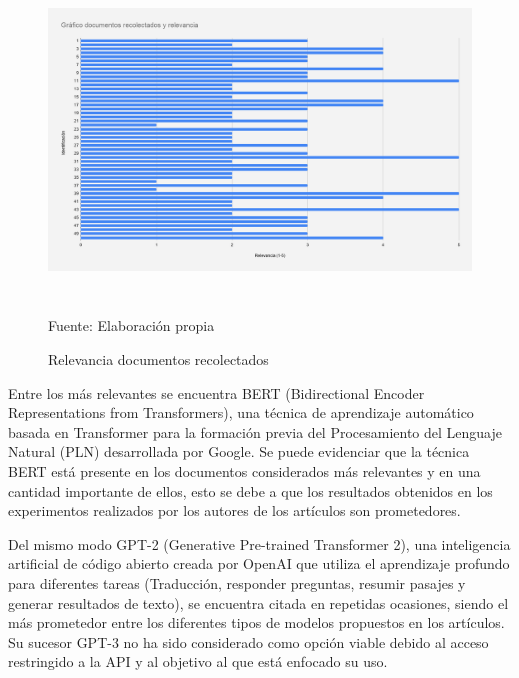 \documentclass[../Main.tex]{subfiles}
\begin{document}
\begin{figure}[H]
	\begin{Center}
		\includegraphics[width=6in,height=3.3in]{Images/GraficoPapers.png}
	    \caption{Relevancia documentos recolectados}
	    Fuente: Elaboración propia
        \label{fig:section}
	\end{Center}
\end{figure}

\begin{justify}
Entre los más relevantes se encuentra BERT (Bidirectional Encoder Representations from Transformers), una técnica de aprendizaje automático basada en Transformer para la formación previa del Procesamiento del Lenguaje Natural (PLN) desarrollada por Google. Se puede evidenciar que la técnica BERT está presente en los documentos considerados más relevantes y en una cantidad importante de ellos, esto se debe a que los resultados obtenidos en los experimentos realizados por los autores de los artículos son prometedores.
\end{justify}

\begin{justify}
Del mismo modo GPT-2 (Generative Pre-trained Transformer 2), una inteligencia artificial de código abierto creada por OpenAI que  utiliza el aprendizaje profundo para diferentes tareas (Traducción, responder preguntas, resumir pasajes y generar resultados de texto), se encuentra citada en repetidas ocasiones, siendo el más prometedor entre los diferentes tipos de modelos propuestos en los artículos. Su sucesor GPT-3 no ha sido considerado como opción viable debido al acceso restringido a la API y al objetivo al que está enfocado su uso.
\end{justify}
\end{document}
